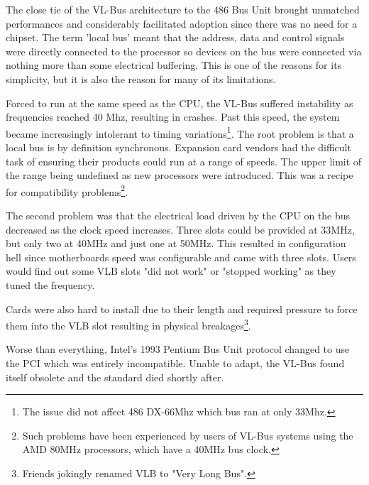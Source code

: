 \par
The close tie of the VL-Bus architecture to the 486 Bus Unit brought unmatched performances and considerably facilitated adoption since there was no need for a chipset. The term 'local bus' meant that the address, data and control signals were directly connected to the processor so devices on the bus were connected via nothing more than some electrical buffering. This is one of the reasons for its simplicity, but it is also the reason for many of its limitations.\\
\par
Forced to run at the same speed as the CPU, the VL-Bus suffered instability as frequencies reached 40 Mhz, resulting in crashes. Past this speed, the system became increasingly intolerant to timing variations\footnote{The issue did not affect 486 DX-66Mhz which bus ran at only 33Mhz.}. The root problem is that a local bus is by definition synchronous. Expansion card vendors had the difficult task of ensuring their products could run at a range of speeds. The upper limit of the range being undefined as new processors were introduced. This was a recipe for compatibility problems\footnote{Such problems have been experienced by users of VL-Bus systems using the AMD 80MHz processors, which have a 40MHz bus clock.}.\\
\par
The second problem was that the electrical load driven by the CPU on the bus decreased as the clock speed increases. Three slots could be provided at 33MHz, but only two at 40MHz and just one at 50MHz. This resulted in configuration hell since motherboards speed was configurable and came with three slots. Users would find out some VLB slots "did not work" or "stopped working" as they tuned the frequency.\\
\par
Cards were also hard to install due to their length and required pressure to force them into the VLB slot resulting in physical breakages\footnote{Friends jokingly renamed VLB to "Very Long Bus".}.\\
\par
  Worse than everything, Intel's 1993 Pentium Bus Unit protocol changed to use the PCI which was entirely incompatible. Unable to adapt, the VL-Bus found itself obsolete and the standard died shortly after.\\
\par

